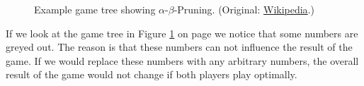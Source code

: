 \begin{figure}[!th]
  \begin{center}
  \end{center}
  \caption{Example game tree showing $\alpha$-$\beta$-Pruning.
    (Original: \href{https://commons.wikimedia.org/wiki/File:AB_pruning.svg}{Wikipedia}.)}
\label{fig:alpha-beta-pruning.pdf}
\end{figure}

If we look at the game tree in Figure \ref{fig:alpha-beta-pruning.pdf} on page
\pageref{fig:alpha-beta-pruning.pdf} we notice that some numbers are greyed out.  The reason is that these
numbers can not influence the result of the game.  If we would replace these numbers with any arbitrary
numbers, the overall result of the game would not change if both players play optimally.
